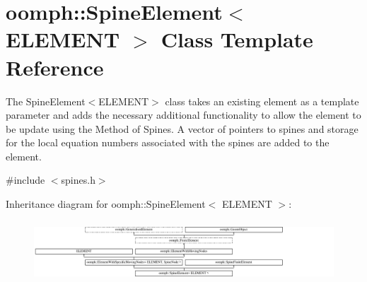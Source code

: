 \hypertarget{classoomph_1_1SpineElement}{}\section{oomph\+:\+:Spine\+Element$<$ E\+L\+E\+M\+E\+NT $>$ Class Template Reference}
\label{classoomph_1_1SpineElement}


The Spine\+Element$<$\+E\+L\+E\+M\+E\+N\+T$>$ class takes an existing element as a template parameter and adds the necessary additional functionality to allow the element to be update using the Method of Spines. A vector of pointers to spines and storage for the local equation numbers associated with the spines are added to the element.  




{\ttfamily \#include $<$spines.\+h$>$}

Inheritance diagram for oomph\+:\+:Spine\+Element$<$ E\+L\+E\+M\+E\+NT $>$\+:\begin{figure}[H]
\begin{center}
\leavevmode
\includegraphics[height=2.287582cm]{classoomph_1_1SpineElement}
\end{center}
\end{figure}
